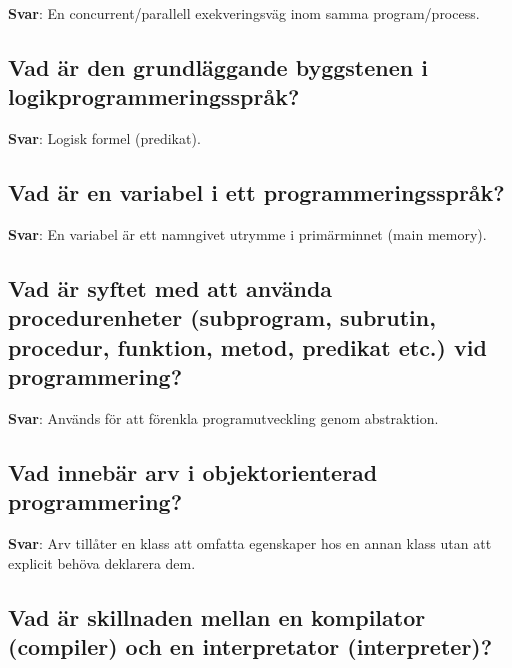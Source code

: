 \documentclass[a4paper,11pt,oneside]{article}
\begin{document}
\begin{sloppypar}
\label{q:215:sa:sv:True}

\textbf{Svar}: En concurrent/parallell exekveringsv\"ag inom samma program/process.



\subsection{Vad \"ar den grundl\"aggande byggstenen i logikprogrammeringsspr\r{a}k?}

\label{q:216:sa:sv:True}

\textbf{Svar}: Logisk formel (predikat).



\subsection{Vad \"ar en variabel i ett programmeringsspr\r{a}k?}

\label{q:217:sa:sv:True}

\textbf{Svar}: En variabel \"ar ett namngivet utrymme i prim\"arminnet (main memory).



\subsection{Vad \"ar syftet med att anv\"anda procedurenheter (subprogram, subrutin, procedur, funktion, metod, predikat etc.) vid programmering?}

\label{q:218:sa:sv:True}

\textbf{Svar}: Anv\"ands f\"or att f\"orenkla programutveckling genom abstraktion.



\subsection{Vad inneb\"ar arv i objektorienterad programmering?}

\label{q:219:sa:sv:True}

\textbf{Svar}: Arv till\r{a}ter en klass att omfatta egenskaper hos en annan klass utan att explicit beh\"ova deklarera dem.



\subsection{Vad \"ar skillnaden mellan en kompilator (compiler) och en interpretator (interpreter)?}


\end{sloppypar}
\end{document}
